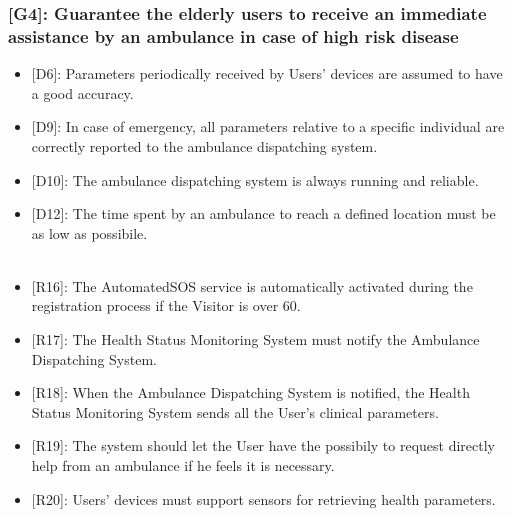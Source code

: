 \documentclass[12pt,a4paper]{article}
\begin{document}
		\subsubsection*{{[}{G4}{]}: Guarantee the elderly users to receive an immediate assistance by an ambulance in case of high risk disease}
			\begin{itemize}
				\begin{itemize}
					\item {[D6]}: Parameters periodically received by Users' devices are assumed to have a good accuracy. 
					\item {[D9]}: In case of emergency, all parameters relative to a specific individual are correctly reported to the ambulance dispatching system.
					\item {[D10]}: The ambulance dispatching system is always running and reliable.
					\item {[D12]}: The time spent by an ambulance to reach a defined location must be as low as possibile. 
					\\\\
					\item {[R16]}: The AutomatedSOS service is automatically activated during the registration process if the Visitor is over 60.
					\item {[R17]}: The Health Status Monitoring System must notify the Ambulance Dispatching System. 
					\item {[R18]}: When the Ambulance Dispatching System is notified, the Health Status Monitoring System sends all the User's clinical parameters.
					\item {[R19]}: The system should let the User have the possibily to request directly help from an ambulance if he feels it is necessary.
					\item {[R20]}: Users' devices must support sensors for retrieving health parameters.
				\end{itemize}
			\end{itemize}
\end{document}

